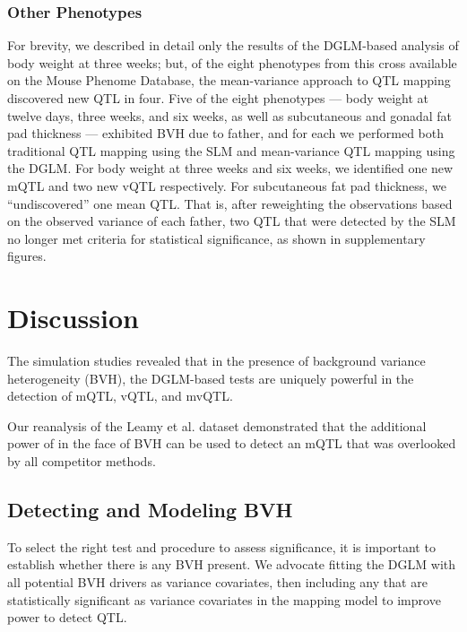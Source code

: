     \subsubsection{Other Phenotypes}
    For brevity, we described in detail only the results of the DGLM-based analysis of body weight at three weeks; but, of the eight phenotypes from this cross available on the Mouse Phenome Database, the mean-variance approach to QTL mapping discovered new QTL in four.
    Five of the eight phenotypes --- body weight at twelve days, three weeks, and six weeks, as well as subcutaneous and gonadal fat pad thickness --- exhibited BVH due to father, and for each we performed both traditional QTL mapping using the SLM and mean-variance QTL mapping using the DGLM.
    For body weight at three weeks and six weeks, we identified one new mQTL and two new vQTL respectively.
    For subcutaneous fat pad thickness, we ``undiscovered'' one mean QTL.
    That is, after reweighting the observations based on the observed variance of each father, two QTL that were detected by the SLM no longer met criteria for statistical significance, as shown in supplementary figures.
    

\section{Discussion}

The simulation studies revealed that in the presence of background variance heterogeneity (BVH), the DGLM-based tests are uniquely powerful in the detection of mQTL, vQTL, and mvQTL.

Our reanalysis of the Leamy et al. dataset demonstrated that the additional power of \DGLMm in the face of BVH can be used to detect an mQTL that was overlooked by all competitor methods.

\subsection{Detecting and Modeling BVH}
To select the right test and procedure to assess significance, it is important to establish whether there is any BVH present.
We advocate fitting the DGLM with all potential BVH drivers as variance covariates, then including any that are statistically significant as variance covariates in the mapping model to improve power to detect QTL.

